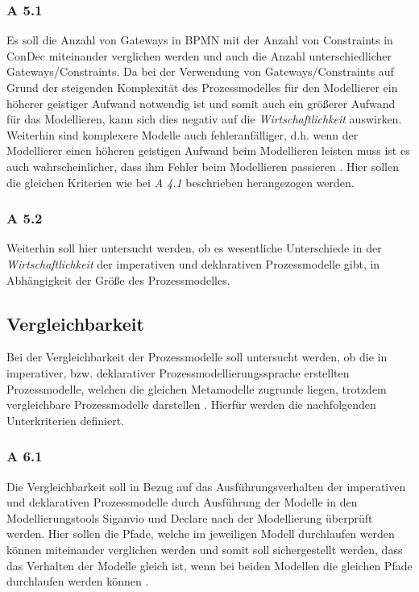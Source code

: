 \subsubsection{A 5.1}
Es soll die Anzahl von Gateways in BPMN mit der Anzahl von Constraints in ConDec miteinander verglichen werden und auch die Anzahl unterschiedlicher Gateways/Constraints. Da bei der Verwendung von Gateways/Constraints auf Grund der steigenden Komplexität des Prozessmodelles für den Modellierer ein höherer geistiger Aufwand notwendig ist und somit auch ein größerer Aufwand für das Modellieren, kann sich dies negativ auf die \textit{Wirtschaftlichkeit} auswirken. Weiterhin sind komplexere Modelle auch fehleranfälliger, d.h. wenn der Modellierer einen höheren geistigen Aufwand beim Modellieren leisten muss ist es auch wahrscheinlicher, dass ihm Fehler beim Modellieren passieren \cite{freund2007, journals95, leimeister2012,mendling2010seven}.
Hier sollen die gleichen Kriterien wie bei \textit{A 4.1} beschrieben herangezogen werden.


\subsubsection{A 5.2}
Weiterhin soll hier untersucht werden, ob es wesentliche Unterschiede in der \textit{Wirtschaftlichkeit} der imperativen und deklarativen Prozessmodelle gibt, in Abhängigkeit der Größe des Prozessmodelles. 


\subsection{Vergleichbarkeit}
Bei der Vergleichbarkeit der Prozessmodelle soll untersucht werden, ob die in imperativer, bzw. deklarativer Prozessmodellierungssprache erstellten Prozessmodelle, welchen die gleichen Metamodelle zugrunde liegen, trotzdem vergleichbare Prozessmodelle darstellen \cite{freund2007, journals95, leimeister2012}. Hierfür werden die nachfolgenden Unterkriterien definiert.

\subsubsection{A 6.1}
Die Vergleichbarkeit soll in Bezug auf das Ausführungsverhalten der imperativen und deklarativen Prozessmodelle durch Ausführung der Modelle in den Modellierungstools Siganvio und Declare nach der Modellierung überprüft werden. Hier sollen die Pfade, welche im jeweiligen Modell durchlaufen werden können miteinander verglichen werden und somit soll sichergestellt werden, dass das Verhalten der Modelle gleich ist, wenn bei beiden Modellen die gleichen Pfade durchlaufen werden können \cite{haisjackl2014understanding}.

